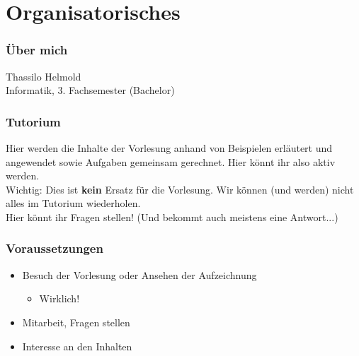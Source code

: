 
\newcommand{\mydate}{28.10.2016}

\newcommand{\handout}{}



\graphicspath{{../figures/}}



\section{Organisatorisches}

\begin{frame}
	\frametitle{Über mich}
	Thassilo Helmold \\
	Informatik, 3. Fachsemester (Bachelor)
\end{frame}

\begin{frame}
	\frametitle{Tutorium}
	Hier werden die Inhalte der Vorlesung anhand von Beispielen erläutert und angewendet sowie Aufgaben gemeinsam gerechnet. Hier könnt ihr also aktiv werden. \\ Wichtig: Dies ist \textbf{kein} Ersatz für die Vorlesung. Wir können (und werden) nicht alles im Tutorium wiederholen. \\[2em]
	\pause
	Hier könnt ihr Fragen stellen! (Und bekommt auch meistens eine Antwort...)
\end{frame}

\begin{frame}
	\frametitle{Voraussetzungen}
	\begin{itemize}
		\item Besuch der Vorlesung oder Ansehen der Aufzeichnung
		\begin{itemize} \item Wirklich! \end{itemize}
		\item Mitarbeit, Fragen stellen
		\item Interesse an den Inhalten
	\end{itemize}
\end{frame}


